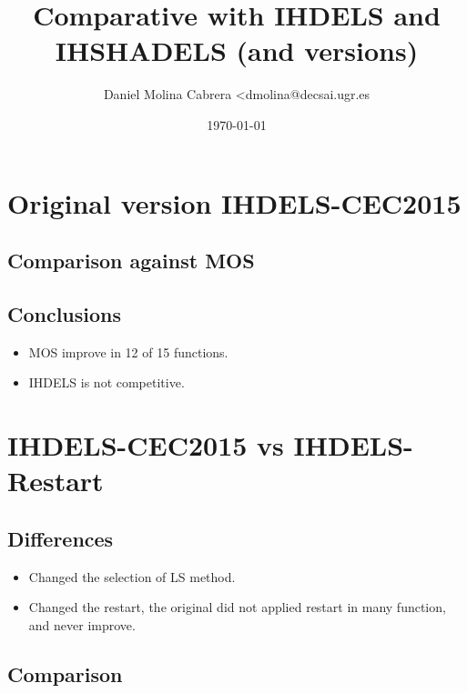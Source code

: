 \documentclass[11pt]{article}
\author{Daniel Molina Cabrera <dmolina@decsai.ugr.es}
\date{\today}
\title{Comparative with IHDELS and IHSHADELS (and versions)}
\begin{document}
\maketitle
\tableofcontents


\section{Original version IHDELS-CEC2015}
\label{sec:org94939ca}


\subsection{Comparison against MOS}
\label{sec:org4487420}



\subsection{Conclusions}
\label{sec:org8a2809b}

\begin{itemize}
\item MOS improve in 12 of 15 functions.
\item IHDELS is not competitive.
\end{itemize}


\section{IHDELS-CEC2015 vs IHDELS-Restart}
\label{sec:org3874841}

\subsection{Differences}
\label{sec:org1e63b23}

\begin{itemize}
\item Changed the selection of LS method.

\item Changed the restart, the original did not applied restart in many function,
and never improve.
\end{itemize}

\subsection{Comparison}
\label{sec:org6726dc8}


\end{document}
